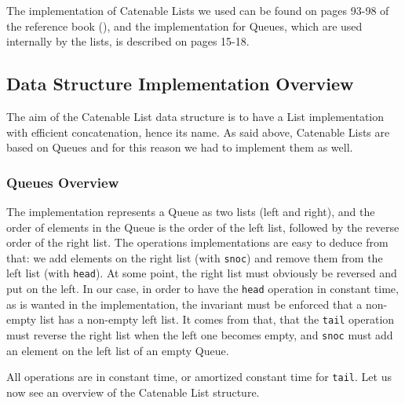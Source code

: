 The implementation of Catenable Lists we used can be found 
on pages 93-98 of the reference book (\cite{Okasaki}),
and the implementation for Queues, 
which are used internally by the lists, 
is described on pages 15-18.

\subsection{Data Structure Implementation Overview}
The aim of the Catenable List data structure is 
to have a List implementation with efficient concatenation, 
hence its name.
As said above, Catenable Lists are based on Queues
and for this reason we had to implement them as well.

\subsubsection{Queues Overview}
The implementation represents a Queue as two lists (left and right), 
and the order of elements in the Queue is the order of the left list, 
followed by the reverse order of the right list.
The operations implementations are easy to deduce from that: 
we add elements on the right list (with \verb|snoc|) 
and remove them from the left list (with \verb|head|).
At some point, the right list must obviously be reversed and put on the left.
In our case, in order to have the \verb|head|
operation in constant time,
as is wanted in the implementation,
the invariant must be enforced that a non-empty list has a non-empty left list.
It comes from that, 
that the \verb|tail| operation must reverse the right list when the left one becomes empty, 
and \verb|snoc| must add an element on the left list of an empty Queue.

All operations are in constant time, or amortized constant time for \verb|tail|.
Let us now see an overview of the Catenable List structure.

